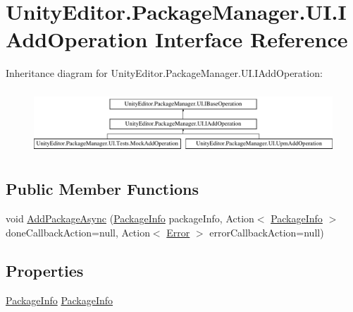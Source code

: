 \hypertarget{interface_unity_editor_1_1_package_manager_1_1_u_i_1_1_i_add_operation}{}\section{Unity\+Editor.\+Package\+Manager.\+U\+I.\+I\+Add\+Operation Interface Reference}
\label{interface_unity_editor_1_1_package_manager_1_1_u_i_1_1_i_add_operation}
Inheritance diagram for Unity\+Editor.\+Package\+Manager.\+U\+I.\+I\+Add\+Operation\+:\begin{figure}[H]
\begin{center}
\leavevmode
\includegraphics[height=2.420749cm]{interface_unity_editor_1_1_package_manager_1_1_u_i_1_1_i_add_operation}
\end{center}
\end{figure}
\subsection*{Public Member Functions}
\begin{DoxyCompactItemize}
\item 
void \mbox{\hyperlink{interface_unity_editor_1_1_package_manager_1_1_u_i_1_1_i_add_operation_aa242e0ad5710496afa857315b7f82e2c}{Add\+Package\+Async}} (\mbox{\hyperlink{class_unity_editor_1_1_package_manager_1_1_u_i_1_1_package_info}{Package\+Info}} package\+Info, Action$<$ \mbox{\hyperlink{class_unity_editor_1_1_package_manager_1_1_u_i_1_1_package_info}{Package\+Info}} $>$ done\+Callback\+Action=null, Action$<$ \mbox{\hyperlink{namespace_unity_editor_1_1_package_manager_1_1_u_i_ab1815eb3e48074893d9dc1dc99a4a32aa902b0d55fddef6f8d651fe1035b7d4bd}{Error}} $>$ error\+Callback\+Action=null)
\end{DoxyCompactItemize}
\subsection*{Properties}
\begin{DoxyCompactItemize}
\item 
\mbox{\hyperlink{class_unity_editor_1_1_package_manager_1_1_u_i_1_1_package_info}{Package\+Info}} \mbox{\hyperlink{interface_unity_editor_1_1_package_manager_1_1_u_i_1_1_i_add_operation_a153d9a210e9b6a97954b31ad9871a833}{Package\+Info}}
\end{DoxyCompactItemize}
